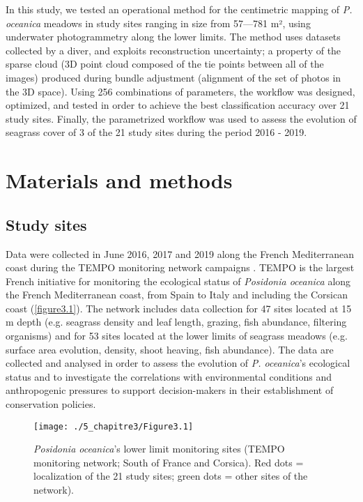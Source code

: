 In this study, we tested an operational method for the centimetric mapping of \textit{P. oceanica} meadows in study sites ranging in size from 57---781 m², using underwater photogrammetry along the lower limits. The method uses datasets collected by a diver, and exploits reconstruction uncertainty; a property of the sparse cloud (3D point cloud composed of the tie points between all of the images) produced during bundle adjustment (alignment of the set of photos in the 3D space). Using 256 combinations of parameters, the workflow was designed, optimized, and tested in order to achieve the best classification accuracy over 21 study sites. Finally, the parametrized workflow was used to assess the evolution of seagrass cover of 3 of the 21 study sites during the period 2016 - 2019.


\section{Materials and methods}\label{chapitre3_2}

\subsection{Study sites}
Data were collected in June 2016, 2017 and 2019 along the French Mediterranean coast during the TEMPO monitoring network campaigns \citep{andromede-oceanologie_tempo_2020}. TEMPO is the largest French initiative for monitoring the ecological status of \textit{Posidonia oceanica} along the French Mediterranean coast, from Spain to Italy and including the Corsican coast (\autoref{figure3.1}). The network includes data collection for 47 sites located at 15 m depth (e.g. seagrass density and leaf length, grazing, fish abundance, filtering organisms) and for 53 sites located at the lower limits of seagrass meadows (e.g. surface area evolution, density, shoot heaving, fish abundance). The data are collected and analysed in order to assess the evolution of \textit{P. oceanica}’s ecological status and to investigate the correlations with environmental conditions and anthropogenic pressures to support decision-makers in their establishment of conservation policies.


\begin{figure}[H]
	\begin{center}
	\texttt{[image: ./5\_chapitre3/Figure3.1]}
		\caption[\textit{Posidonia oceanica}’s lower limit monitoring sites.]{\textit{Posidonia oceanica}’s lower limit monitoring sites (TEMPO monitoring network; South of France and Corsica). Red dots = localization of the 21 study sites; green dots = other sites of the network).}
	\label{figure3.1}
\end{center}
\end{figure}


